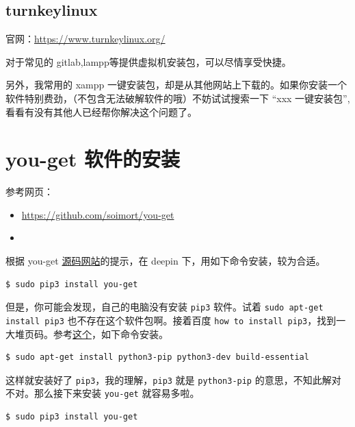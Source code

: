 \documentclass[doctor,openright,twoside]{sjtuthesis}
\newcommand{\passthrough}[1]{#1}
\theoremstyle{plain}
\theoremstyle{definition}
\theoremstyle{remark}
\theoremstyle{ocrenumbox}
\theoremstyle{plain}
\begin{document}
\hypertarget{turnkeylinux}{%
\subsection{turnkeylinux}\label{turnkeylinux}}

官网：\url{https://www.turnkeylinux.org/}

对于常见的 gitlab,lampp等提供虚拟机安装包，可以尽情享受快捷。

另外，我常用的 xampp 一键安装包，却是从其他网站上下载的。如果你安装一个软件特别费劲，（不包含无法破解软件的哦）不妨试试搜索一下 ``xxx 一键安装包'',看看有没有其他人已经帮你解决这个问题了。

\hypertarget{you-get-}{%
\section{you-get 软件的安装}\label{you-get-}}

参考网页：

\begin{itemize}
\item
  \url{https://github.com/soimort/you-get}
\item
\end{itemize}

根据 you-get \href{https://github.com/soimort/you-get}{源码网站}的提示，在 deepin 下，用如下命令安装，较为合适。

\begin{lstlisting}[language=bash]
$ sudo pip3 install you-get
\end{lstlisting}

但是，你可能会发现，自己的电脑没有安装 \passthrough{\lstinline!pip3!} 软件。试着 \passthrough{\lstinline!sudo apt-get install pip3!} 也不存在这个软件包啊。接着百度 \passthrough{\lstinline!how to install pip3!}，找到一大堆页码。参考\href{http://ask.xmodulo.com/install-pip-linux.html}{这个}，如下命令安装。

\begin{lstlisting}[language=bash]
$ sudo apt-get install python3-pip python3-dev build-essential
\end{lstlisting}

这样就安装好了 \passthrough{\lstinline!pip3!}，我的理解，\passthrough{\lstinline!pip3!} 就是 \passthrough{\lstinline!python3-pip!} 的意思，不知此解对不对。那么接下来安装 \passthrough{\lstinline!you-get!} 就容易多啦。

\begin{lstlisting}[language=bash]
$ sudo pip3 install you-get
\end{lstlisting}
\end{document}
